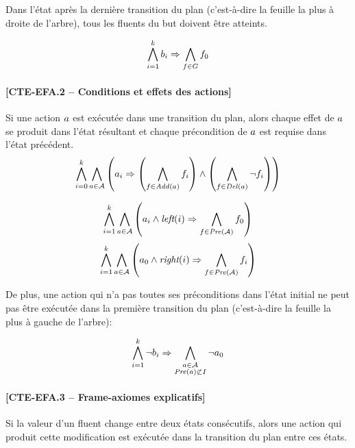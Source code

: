 Dans l'état après la dernière transition du plan (c'est-à-dire la feuille la plus à droite de l'arbre), tous les fluents du but doivent être atteints.

\[ \bigwedge\limits_{\substack{i=1}}^{k} b_{i} \Rightarrow \bigwedge\limits_{\substack{f\in G}} {f}_{0} \]	

\paragraph*{[CTE-EFA.2 -- Conditions et effets des actions]}

Si une action $a$ est exécutée dans une transition du plan, alors chaque effet de $a$ se produit dans l'état résultant et chaque précondition de $a$ est requise dans l'état précédent.
\[ \bigwedge\limits_{\substack{i=0}}^{k} \bigwedge\limits_{\substack{a \in \mathcal{A}}} \left(a_{i} \Rightarrow \left( \bigwedge\limits_{\substack{f\in \mathit{Add}(a)}} f_{i} \right) \wedge \left( \bigwedge\limits_{\substack{f\in \mathit{Del}(a)}} \neg f_{i} \right) \right) \]

\[ \bigwedge\limits_{\substack{i=1}}^{k} \bigwedge\limits_{\substack{a\in \mathcal{A}}}
\left(a_{i} \wedge \textit{left}(i) \Rightarrow \bigwedge\limits_{\substack{f \in \mathit{Pre}(\mathcal{A})}} f_{0}\right)\]
\[\bigwedge\limits_{\substack{i=1}}^{k} \bigwedge\limits_{\substack{a\in \mathcal{A}}}
\left(a_{0} \wedge \textit{right}(i) \Rightarrow \bigwedge\limits_{\substack{f \in \mathit{Pre}(\mathcal{A})}} f_{i}\right)\]

De plus, une action qui n'a pas toutes ses préconditions dans l'état initial ne peut pas être exécutée dans la première transition du plan (c'est-à-dire la feuille la plus à gauche de l'arbre):

\[ \bigwedge\limits_{\substack{i=1}}^{k}\neg b_{i} \Rightarrow \bigwedge\limits_{\substack{a\in \mathcal{A}\\ \mathit{Pre}(a) \not\subset I}} \neg {a}_{0} \]

\paragraph*{[CTE-EFA.3 -- Frame-axiomes explicatifs]}

Si la valeur d'un fluent change entre deux états consécutifs, alors une action qui produit cette modification est exécutée dans la transition du plan entre ces états.

